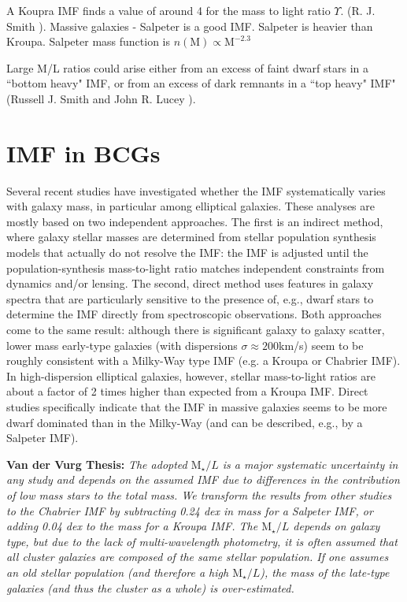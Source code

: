 A Koupra IMF finds a value of around 4 for the mass to light ratio $\Upsilon$. (R. J. Smith \citeyear{Reference5}). Massive galaxies - Salpeter is a good IMF. Salpeter is heavier than Kroupa. Salpeter mass function is $n(\textrm{M})\propto \textrm{M}^{-2.3}$ 

Large M/L ratios could arise either from an excess of faint dwarf stars in a ``bottom heavy" IMF, or from an excess of dark remnants in a ``top heavy" IMF" (Russell J. Smith and John R. Lucey \citeyear{Reference7}).

\section{IMF in BCGs}

Several recent studies have investigated whether the IMF systematically varies with galaxy mass, in particular among elliptical galaxies. These analyses are mostly based on two independent approaches. The first is an indirect method, where galaxy stellar masses are determined from stellar population synthesis models that actually do not resolve the IMF: the IMF is adjusted until the population-synthesis mass-to-light ratio matches independent constraints from dynamics and/or lensing. The second, direct method uses features in galaxy spectra that are particularly sensitive to the presence of, e.g., dwarf stars to determine the IMF directly from spectroscopic observations. Both approaches come to the same result: although there is significant galaxy to galaxy scatter, lower mass early-type galaxies (with dispersions $\sigma \approx 200$km/s) seem to be roughly consistent with a Milky-Way type IMF (e.g. a Kroupa or Chabrier IMF). In high-dispersion elliptical galaxies, however, stellar mass-to-light ratios are about a factor of 2 times higher than expected from a Kroupa IMF. Direct studies specifically indicate that the IMF in massive galaxies seems to be more dwarf dominated than in the Milky-Way (and can be described, e.g., by a Salpeter IMF).

\textbf{Van der Vurg Thesis:} \textit{The adopted $\text{M}_{\star}/L$ is a major systematic uncertainty in any study and depends on the assumed IMF due to differences in the contribution of low mass stars to the total mass. We transform the results from other studies to the Chabrier IMF by subtracting 0.24 dex in mass for a Salpeter IMF, or adding 0.04 dex to the mass for a Kroupa IMF. The $\text{M}_{\star}/L$ depends on galaxy type, but due to the lack of multi-wavelength photometry, it is often assumed that all cluster galaxies are composed of the same stellar population. If one assumes an old stellar population (and therefore a high $\text{M}_{\star}/L$), the mass of the late-type galaxies (and thus the cluster as a whole) is over-estimated.} \citeyear{Reference2}

